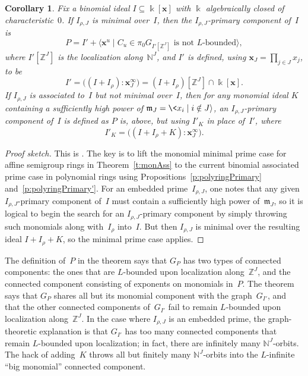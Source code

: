 \documentclass[12pt]{amsart}
\numberwithin{equation}{section}
\newtheorem{cor}[thm]{Corollary}
\theoremstyle{definition}
\begin{document}
\begin{cor}\label{c:primDecomp}
Fix a binomial ideal $I \subseteq {\Bbbk}[{\mathbf{x}}]$ with ${\Bbbk}$ algebraically
closed of characteristic~$0$.  If $I_{\rho,J}$ is minimal over~$I$,
then the $I_{\rho,J}$-primary component of~$I$ is
$$  P = I' + {\langle}{\mathbf{x}}^u \mid C_u \in \pi_0 G_{I'[{\mathbb{Z}}^J]} \text{ is not $L$-bounded}{\rangle},
$$
where $I'[{\mathbb{Z}}^J]$ is the localization along~${\mathbb{N}}^J$, and $I'$ is
defined, using ${\mathbf{x}}_J = \prod_{j \in J} x_j$, to be
$$  I' = \big((I + I_\rho):{\mathbf{x}}_J^\infty\big) = (I + I_\rho)[{\mathbb{Z}}^J] \cap {\Bbbk}[{\mathbf{x}}].
$$
If $I_{\rho,J}$ is associated to~$I$ but not minimal over~$I$, then
for any monomial ideal $K$ containing a sufficiently high power of\/
${\mathfrak{m}}_J = \<x_i \mid i \notin J{\rangle}$, an $I_{\rho,J}$-primary component
of~$I$ is defined as $P$ is, above, but using $I'_K$ in place of~$I'$,
where
$$  I'_K = \big((I + I_\rho + K):{\mathbf{x}}_J^\infty\big).
$$
\end{cor}
\begin{proof}[Proof sketch]
This is \cite[Theorem~3.2]{primDecomp}.  The key is to lift the
monomial minimal prime case for affine semigroup rings in
Theorem~\ref{t:monAss} to the current binomial associated prime case
in polynomial rings using Propositions~\ref{p:polyringPrimary}
and~\ref{p:polyringPrimary'}.  For
an embedded prime~$I_{\rho,J}$, one notes that any given
$I_{\rho,J}$-primary component of~$I$ must contain a sufficiently high
power of~${\mathfrak{m}}_J$, so it is logical to begin the search for an
$I_{\rho,J}$-primary component by simply throwing such monomials along
with~$I_\rho$ into~$I$.
But then $I_{\rho,J}$ is minimal over the resulting ideal $I + I_\rho
+ K$, so the minimal prime case applies.
\end{proof}

The definition of~$P$ in the theorem says that $G_P$ has two types of
connected components: the ones that are $L$-bounded upon localization
along~${\mathbb{Z}}^J$, and the connected component consisting of exponents on
monomials in~$P$.  The theorem says that $G_P$ shares all but its
monomial component with the graph~$G_{I'}$, and that the other
connected components of~$G_{I'}$ fail to remain $L$-bounded upon
localization along~${\mathbb{Z}}^J$.  In the case where $I_{\rho,J}$ is an
embedded prime, the graph-theoretic explanation is that $G_{I'}$ has
too many connected components that remain $L$-bounded upon
localization; in fact, there are infinitely many ${\mathbb{N}}^J$-orbits.  The
hack of adding~$K$ throws all but finitely many ${\mathbb{N}}^J$-orbits into
the $L$-infinite ``big monomial'' connected component.
\end{document}
